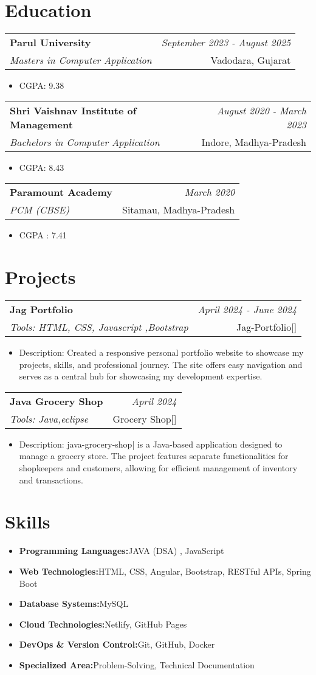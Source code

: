 \documentclass[a4paper,11pt]{article}
\makeatletter
\newcommand{\resumeItem}[2]{
  \item{
    \textbf{#1}{\hspace{0.5mm}#2 \vspace{-0.5mm}}
  }
}
\newcommand{\resumeSubheading}[4]{
\vspace{0.5mm}\item
    \begin{tabular*}{0.98\textwidth}[t]{l@{\extracolsep{\fill}}r}
        \textbf{#1} & \textit{\footnotesize{#4}} \\
        \textit{\footnotesize{#3}} &  \footnotesize{#2}\\
    \end{tabular*}
    \vspace{-2.4mm}
}
\newcommand{\resumeProject}[4]{
\vspace{0.5mm}\item
    \begin{tabular*}{0.98\textwidth}[t]{l@{\extracolsep{\fill}}r}
        \textbf{#1} & \textit{\footnotesize{#3}} \\
        \footnotesize{\textit{#2}} & \footnotesize{#4}
    \end{tabular*}
    \vspace{-2.4mm}
}
\newcommand{\resumeSubItem}[2]{\resumeItem{#1}{#2}\vspace{-4pt}}
\newcommand{\resumeHeadingSkillStart}{\begin{itemize}[leftmargin=*,itemsep=1.7mm, rightmargin=2ex]}
\newcommand{\resumeItemListStart}{\begin{itemize}[leftmargin=*,labelsep=1mm,itemsep=0.5mm]}
\newcommand{\resumeSubHeadingListEnd}{\end{itemize}\vspace{2mm}}
\newcommand{\resumeHeadingSkillEnd}{\end{itemize}\vspace{-2mm}}
\newcommand{\resumeItemListEnd}{\end{itemize}\vspace{-2mm}}
\makeatother
\begin{document}
\section{\textbf{Education}}
\vspace{-2mm}
\resumeSubheading
{Parul University}{Vadodara, Gujarat}
{Masters in Computer Application}{September 2023 - August 2025}
\resumeItemListStart
\item CGPA: 9.38
\resumeItemListEnd
\resumeSubheading
{Shri Vaishnav Institute of Management}{Indore, Madhya-Pradesh}
{Bachelors in Computer Application}{August 2020 - March 2023}
\resumeItemListStart
\item CGPA: 8.43
\resumeItemListEnd
\resumeSubheading
{Paramount Academy}{Sitamau, Madhya-Pradesh}
{PCM (CBSE) }{March  2020}
\resumeItemListStart
\item CGPA : 7.41
\resumeItemListEnd
\vspace{-4mm}

\section{\textbf{Projects}}
\vspace{-2mm}
\resumeProject
  {Jag Portfolio}
  {Tools: \textit{HTML, CSS, Javascript ,Bootstrap} }
  {April  2024 - June 2024}
  {{Jag-Portfolio}[\href{https://jagratimehta410.github.io/jag-portfolio/}{\textcolor{darkblue}{\faGithub}}]}
  \resumeItemListStart
   \item Description: 
   Created a responsive personal portfolio website to showcase my projects, skills, and professional journey. The site offers easy navigation and serves as a central hub for showcasing my development expertise. 
\resumeItemListEnd

\resumeProject
  {Java Grocery Shop}
  {Tools: Java,eclipse}
  {April 2024}
  {{Grocery Shop}[\href{https://github.com/jagratimehta410/java-grocery-shop}{\textcolor{darkblue}{\faGithub}}]}
\resumeItemListStart
  \item Description: java-grocery-shop| is a Java-based application designed to manage a grocery store. The project features separate functionalities for shopkeepers and customers, allowing for efficient management of inventory and transactions. 
\resumeSubHeadingListEnd
\vspace{-7.5mm}

\section{\textbf{Skills}}
\vspace{-0.4mm}
\resumeHeadingSkillStart
\resumeSubItem{Programming Languages:}
    {JAVA (DSA) , JavaScript}
\resumeSubItem{Web Technologies:}
    {HTML, CSS, Angular, Bootstrap, RESTful APIs, Spring Boot}
\resumeSubItem{Database Systems:}
    {MySQL}
\resumeSubItem{Cloud Technologies:}
    {Netlify, GitHub Pages}
\resumeSubItem{DevOps \& Version Control:}
    {Git, GitHub, Docker}
\resumeSubItem{Specialized Area:}
    {Problem-Solving, Technical Documentation}
\resumeHeadingSkillEnd
\vspace{-3mm}
\end{document}
